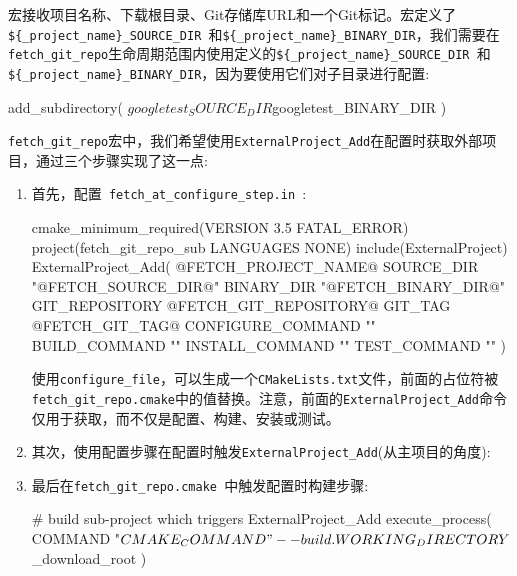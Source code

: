 宏接收项目名称、下载根目录、Git存储库URL和一个Git标记。宏定义了\texttt{\$\{\_project\_name\}\_SOURCE\_DIR }和\texttt{\$\{\_project\_name\}\_BINARY\_DIR}，我们需要在\texttt{fetch\_git\_repo}生命周期范围内使用定义的\texttt{\$\{\_project\_name\}\_SOURCE\_DIR }和\texttt{ \$\{\_project\_name\}\_BINARY\_DIR}，因为要使用它们对子目录进行配置:

\begin{codebox}[cmake]
add_subdirectory(
  ${googletest_SOURCE_DIR}
  ${googletest_BINARY_DIR}
  )
\end{codebox}

\texttt{fetch\_git\_repo}宏中，我们希望使用\texttt{ExternalProject\_Add}在配置时获取外部项目，通过三个步骤实现了这一点:

\begin{enumerate}
\item 首先，配置\texttt{ fetch\_at\_configure\_step.in }:

\begin{codebox}[cmake]
cmake_minimum_required(VERSION 3.5 FATAL_ERROR)
project(fetch_git_repo_sub LANGUAGES NONE)
include(ExternalProject)
ExternalProject_Add(
  @FETCH_PROJECT_NAME@
  SOURCE_DIR "@FETCH_SOURCE_DIR@"
  BINARY_DIR "@FETCH_BINARY_DIR@"
  GIT_REPOSITORY
  @FETCH_GIT_REPOSITORY@
  GIT_TAG
  @FETCH_GIT_TAG@
  CONFIGURE_COMMAND ""
  BUILD_COMMAND ""
  INSTALL_COMMAND ""
  TEST_COMMAND ""
  )
\end{codebox}

使用\texttt{configure\_file}，可以生成一个\texttt{CMakeLists.txt}文件，前面的占位符被\texttt{fetch\_git\_repo.cmake}中的值替换。注意，前面的\texttt{ExternalProject\_Add}命令仅用于获取，而不仅是配置、构建、安装或测试。

\item 其次，使用配置步骤在配置时触发\texttt{ExternalProject\_Add}(从主项目的角度):


\item 最后在\texttt{fetch\_git\_repo.cmake }中触发配置时构建步骤:

\begin{codebox}[cmake]
# build sub-project which triggers ExternalProject_Add
execute_process(
  COMMAND
    "${CMAKE_COMMAND}" --build .
  WORKING_DIRECTORY
    ${_download_root}
  )
\end{codebox}

\end{enumerate}

